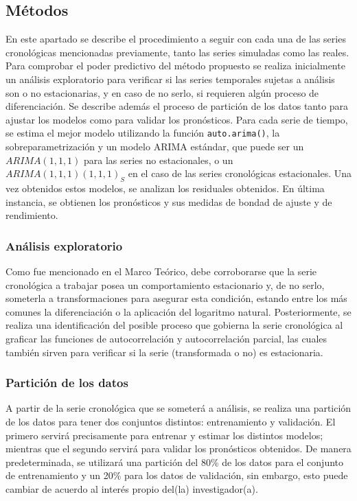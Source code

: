 \documentclass[
]{article}
\begin{document}
\subsection{Métodos}

En este apartado se describe el procedimiento a seguir con cada una de
las series cronológicas mencionadas previamente, tanto las series
simuladas como las reales. Para comprobar el poder predictivo del método
propuesto se realiza inicialmente un análisis exploratorio para
verificar si las series temporales sujetas a análisis son o no
estacionarias, y en caso de no serlo, si requieren algún proceso de
diferenciación. Se describe además el proceso de partición de los datos
tanto para ajustar los modelos como para validar los pronósticos. Para
cada serie de tiempo, se estima el mejor modelo utilizando la función
\texttt{auto.arima()}, la sobreparametrización y un modelo ARIMA
estándar, que puede ser un \(ARIMA(1,1,1)\) para las series no
estacionales, o un \(ARIMA(1,1,1)(1,1,1)_S\) en el caso de las series
cronológicas estacionales. Una vez obtenidos estos modelos, se analizan
los residuales obtenidos. En última instancia, se obtienen los
pronósticos y sus medidas de bondad de ajuste y de rendimiento.

\subsubsection{Análisis exploratorio}

Como fue mencionado en el Marco Teórico, debe corroborarse que la serie
cronológica a trabajar posea un comportamiento estacionario y, de no
serlo, someterla a transformaciones para asegurar esta condición,
estando entre los más comunes la diferenciación o la aplicación del
logaritmo natural. Posteriormente, se realiza una identificación del
posible proceso que gobierna la serie cronológica al graficar las
funciones de autocorrelación y autocorrelación parcial, las cuales
también sirven para verificar si la serie (transformada o no) es
estacionaria.

\subsubsection{Partición de los datos}

A partir de la serie cronológica que se someterá a análisis, se realiza
una partición de los datos para tener dos conjuntos distintos:
entrenamiento y validación. El primero servirá precisamente para
entrenar y estimar los distintos modelos; mientras que el segundo
servirá para validar los pronósticos obtenidos. De manera
predeterminada, se utilizará una partición del 80\% de los datos para el
conjunto de entrenamiento y un 20\% para los datos de validación, sin
embargo, esto puede cambiar de acuerdo al interés propio del(la)
investigador(a).
\end{document}
